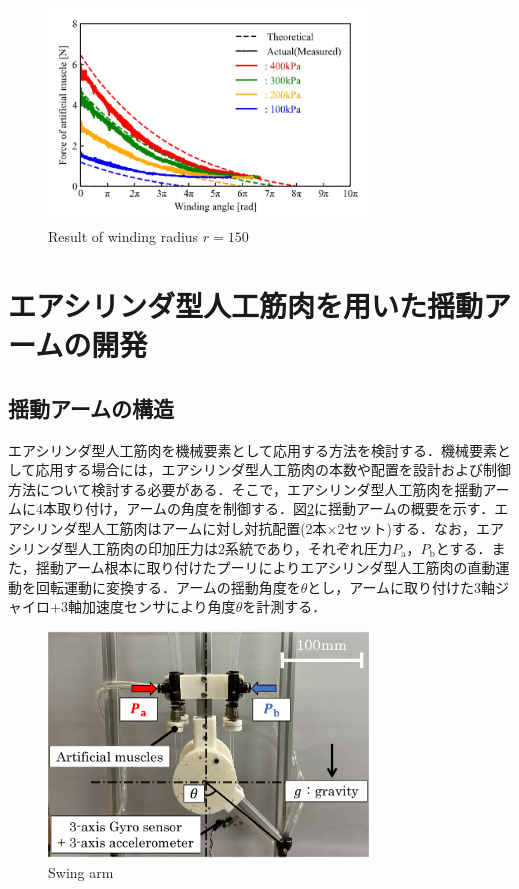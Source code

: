 \begin{figure}[t]
  \centering
  \includegraphics[width=85mm]{_pdf/result_150mm.pdf}
  \caption{Result of winding radius $r=150$}
  \label{r=150mm}
\end{figure}

\section{エアシリンダ型人工筋肉を用いた揺動アームの開発}%
\subsection{揺動アームの構造}
エアシリンダ型人工筋肉を機械要素として応用する方法を検討する．機械要素として応用する場合には，エアシリンダ型人工筋肉の本数や配置を設計および制御方法について検討する必要がある．そこで，エアシリンダ型人工筋肉を揺動アームに4本取り付け，アームの角度を制御する．図\ref{Swing arm}に揺動アームの概要を示す．エアシリンダ型人工筋肉はアームに対し対抗配置(2本×2セット)する．なお，エアシリンダ型人工筋肉の印加圧力は2系統であり，それぞれ圧力$P_\mathrm{a}$，$P_\mathrm{b}$とする．また，揺動アーム根本に取り付けたプーリによりエアシリンダ型人工筋肉の直動運動を回転運動に変換する．アームの揺動角度を$\theta$とし，アームに取り付けた3軸ジャイロ+3軸加速度センサにより角度$\theta$を計測する．
\begin{figure}[t]
  \centering
  \includegraphics[width=85mm]{_pdf/swing_arm.pdf}
  \caption{Swing arm}
  \label{Swing arm}
\end{figure}

